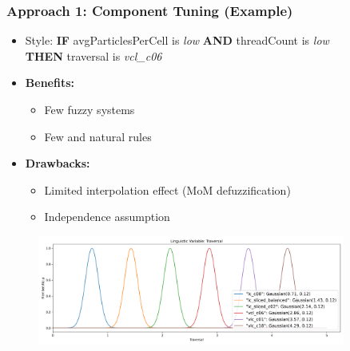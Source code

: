 \documentclass[
	10pt,
	t		%
]{beamer}
\begin{document}
\begin{frame}
	\frametitle{Approach 1: Component Tuning (Example)}
	\begin{itemize}
		\item Style: {\small \textbf{IF} avgParticlesPerCell is \textit{low} \textbf{AND} threadCount is \textit{low}\\ \qquad  \qquad \quad \textbf{THEN} traversal is \textit{vcl\_c06}}
		\item \textbf{Benefits:}
		      \begin{itemize}
			      \item Few fuzzy systems
			      \item Few and natural rules
		      \end{itemize}
		\item \textbf{Drawbacks:}
		      \begin{itemize}
			      \item Limited interpolation effect (MoM defuzzification)
			      \item Independence assumption
		      \end{itemize}
		      
		      
	\end{itemize}
	
	\begin{figure}
		\centering
		\includegraphics[width=0.9\textwidth,trim={0 0 0 1cm},clip]
		{figures/component-linguistic-variable.png}
	\end{figure}
	
\end{frame}
\end{document}

